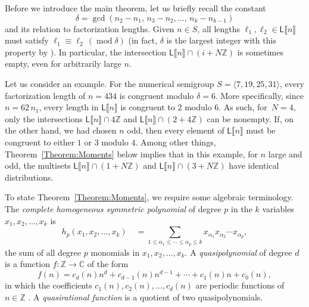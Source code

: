 \documentclass[10pt,reqno]{amsart}
\newcommand{\ZZ}{\mathbb{Z}}
\newcommand{\CC}{\mathbb{C}}
\newcommand{\Le}{\mathsf{L}}
\providecommand{\multi}[1]{\llbracket #1 \rrbracket}
\newcommand{\0}{\color{lightgray}0}
\renewcommand{\pmod}[1]{\,(\operatorname{mod} #1)}
\renewcommand\>{\rangle}
\newcommand\<{\langle}
\theoremstyle{plain}
\theoremstyle{definition}
\begin{document}
Before we introduce the main theorem, let us briefly recall the constant
\begin{equation*}
\delta = \gcd(n_2 - n_1,\, n_3-n_2,\ldots, \,n_k - n_{k-1})
\end{equation*}
and its relation to factorization lengths.  Given $n \in S$, all lengths $\ell_1, \ell_2 \in \Le\multi{n}$ must satisfy $\ell_1 \equiv \ell_2 \pmod \delta$ (in fact, $\delta$ is the largest integer with this property by \cite[Prop.~2.9]{bowles2006delta}).  In particular, the intersection $\Le\multi{n} \cap (i + N\ZZ)$ is sometimes empty, even for arbitrarily large $n$.  

Let us consider an example.  For the numerical semigroup $S = \<7, 19, 25, 31\>$, every factorization length of $n = 434$ is congruent modulo $\delta = 6$.  More specifically, since $n = 62 \, n_1$, every length in $\Le\multi{n}$ is congruent to $2$ modulo $6$.  As such, for~$N = 4$, only the intersections $\Le\multi{n} \cap 4\ZZ$ and $\Le\multi{n} \cap (2 + 4\ZZ)$ can be nonempty.  If, on the other hand, we had chosen $n$ odd, then every element of $\Le\multi{n}$ must be congruent to either $1$ or $3$ modulo $4$.  
Among other things, Theorem~\ref{Theorem:Moments} below implies that in this example, for $n$ large and odd, the multisets $\Le\multi{n} \cap (1 + N\ZZ)$ and $\Le\multi{n} \cap (3 + N\ZZ)$ have identical distributions.  

To state Theorem~\ref{Theorem:Moments}, we require some algebraic terminology.
The \emph{complete homogeneous symmetric polynomial} of degree $p$ in the
$k$ variables $x_1, x_2, \ldots, x_k$ is
\begin{equation*}
h_p(x_1,x_2,\ldots,x_k) \quad=\!\! 
\sum_{1 \leq \alpha_1 \leq \cdots \leq \alpha_{p} \leq k} x_{\alpha_1} x_{\alpha_2}\cdots x_{\alpha_p},
\end{equation*}
the sum of all degree $p$ monomials in $x_1,x_2,\ldots,x_k$.  A \emph{quasipolynomial} of degree $d$ is a function $f:\ZZ\to\CC$ of the form
\begin{equation*}
f(n) = c_d(n) n^d + c_{d-1}(n) n^{d-1} + \cdots + c_1(n) n + c_0(n),
\end{equation*}
in which the coefficients $c_1(n), c_2(n),\ldots, c_d(n)$
are periodic functions of $n \in \ZZ$ \cite{continuousdiscretely}.  A \emph{quasirational function} is a quotient of two quasipolynomials.
\end{document}
